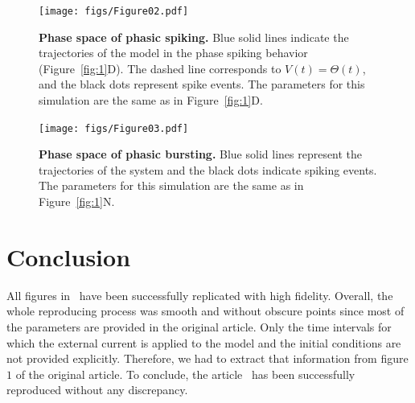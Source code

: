 \documentclass[10pt,a4paper,onecolumn]{article}
\begin{document}
\begin{figure}[htpb!]
    \centering
    \texttt{[image: figs/Figure02.pdf]}
    \caption{{\bfseries \sffamily Phase space of phasic spiking.} Blue
    solid lines indicate the trajectories of the model in the phase spiking
    behavior (Figure~\ref{fig:1}D). The dashed line corresponds to $V(t) =
    \Theta(t)$, and the black dots represent spike events. The parameters for 
    this simulation are the same as in Figure~\ref{fig:1}D.}
    \label{fig:2}
\end{figure}

\begin{figure}[htpb!]
    \centering
    \texttt{[image: figs/Figure03.pdf]}
    \caption{{\bfseries \sffamily Phase space of phasic bursting.} Blue solid
    lines represent the trajectories of the system and the black dots indicate
    spiking events. The parameters for this simulation are the same as in
    Figure~\ref{fig:1}N.}
    \label{fig:3}
\end{figure}

\section{Conclusion}\label{conclusion}

All figures in~\textcite{mihalas:2009} have been successfully replicated 
with high fidelity. Overall, the whole reproducing process was smooth and
without obscure points since most of the parameters are provided in the
original article. Only the time intervals for which the external current is
applied to the model and the initial conditions are not provided explicitly.
Therefore, we had to extract that information from figure $1$ of the original
article. To conclude, the
article~\cite{mihalas:2009} has been successfully reproduced without any
discrepancy. 

{\sffamily \small
  \printbibliography[title=References]
}
\end{document}
